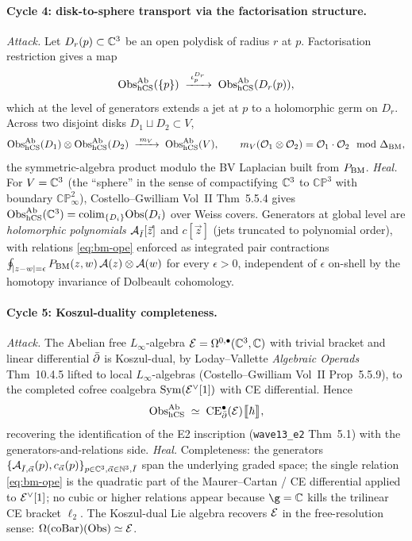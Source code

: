 \paragraph{Cycle 4: disk-to-sphere transport via the factorisation structure.}
\emph{Attack.} Let $D_r(p) \subset \mathbb{C}^3$ be an open polydisk of radius $r$
at $p$. Factorisation restriction gives a map
\[
  \mathrm{Obs}_{\mathrm{hCS}}^{\mathrm{Ab}}(\{p\})
  \;\xrightarrow{\;\iota_p^{D_r}\;}\;
  \mathrm{Obs}_{\mathrm{hCS}}^{\mathrm{Ab}}(D_r(p)),
\]
which at the level of generators extends a jet at $p$ to a holomorphic
germ on $D_r$. Across two disjoint disks $D_1 \sqcup D_2 \subset V$,
\[
  \mathrm{Obs}_{\mathrm{hCS}}^{\mathrm{Ab}}(D_1) \otimes \mathrm{Obs}_{\mathrm{hCS}}^{\mathrm{Ab}}(D_2)
  \;\xrightarrow{\;m_V\;}\;
  \mathrm{Obs}_{\mathrm{hCS}}^{\mathrm{Ab}}(V),
  \qquad
  m_V(\mathcal{O}_1 \otimes \mathcal{O}_2) = \mathcal{O}_1 \cdot \mathcal{O}_2 \mod \Delta_{\mathrm{BM}},
\]
the symmetric-algebra product modulo the BV Laplacian built from $P_{\mathrm{BM}}$.
\emph{Heal.} For $V = \mathbb{C}^3$ (the ``sphere'' in the sense of compactifying
$\mathbb{C}^3$ to $\mathbb{CP}^3$ with boundary $\mathbb{CP}^2_\infty$),
Costello--Gwilliam Vol~II Thm~5.5.4 gives
$\mathrm{Obs}_{\mathrm{hCS}}^{\mathrm{Ab}}(\mathbb{C}^3) = \mathrm{colim}_{\{D_i\}} \mathrm{Obs}(D_i)$
over Weiss covers. Generators at global level are \emph{holomorphic polynomials}
$\mathcal{A}_{\bar{I}}[\vec{z}]$ and $c[\vec{z}]$ (jets truncated to polynomial
order), with relations \eqref{eq:bm-ope} enforced as integrated pair
contractions
$\oint_{|z-w| = \epsilon} P_{\mathrm{BM}}(z, w) \, \mathcal{A}(z) \otimes \mathcal{A}(w)$ for
every $\epsilon > 0$, independent of $\epsilon$ on-shell by the homotopy
invariance of Dolbeault cohomology.

\paragraph{Cycle 5: Koszul-duality completeness.}
\emph{Attack.} The Abelian free $L_\infty$-algebra $\mathcal{E} = \Omega^{0,\bullet}(\mathbb{C}^3, \mathbb{C})$
with trivial bracket and linear differential $\bar{\partial}$ is Koszul-dual, by
Loday--Vallette \emph{Algebraic Operads} Thm~10.4.5 lifted to local
$L_\infty$-algebras (Costello--Gwilliam Vol~II Prop~5.5.9), to the
completed cofree coalgebra $\mathrm{Sym}(\mathcal{E}^{\vee}[1])$ with CE differential.
Hence
\[
  \mathrm{Obs}_{\mathrm{hCS}}^{\mathrm{Ab}}
  \;\simeq\;
  \mathrm{CE}^{\bullet}_{\bar{\partial}}(\mathcal{E})\bigl\llbracket \hbar \bigr\rrbracket,
\]
recovering the identification of the E2 inscription
(\texttt{wave13\_e2} Thm~5.1) with the generators-and-relations side.
\emph{Heal.} Completeness: the generators $\{\mathcal{A}_{\bar{I}, \vec{\alpha}}(p),
c_{\vec{\alpha}}(p)\}_{p \in \mathbb{C}^3, \vec{\alpha} \in \mathbb{N}^3, \bar{I}}$ span
the underlying graded space; the single relation \eqref{eq:bm-ope} is the
quadratic part of the Maurer--Cartan / CE differential applied to
$\mathcal{E}^{\vee}[1]$; no cubic or higher relations appear because $\g = \C$ kills
the trilinear CE bracket $\ell_2$. The Koszul-dual Lie algebra recovers
$\mathcal{E}$ in the free-resolution sense: $\Omega(\mathrm{coBar})(\mathrm{Obs}) \simeq \mathcal{E}$.

